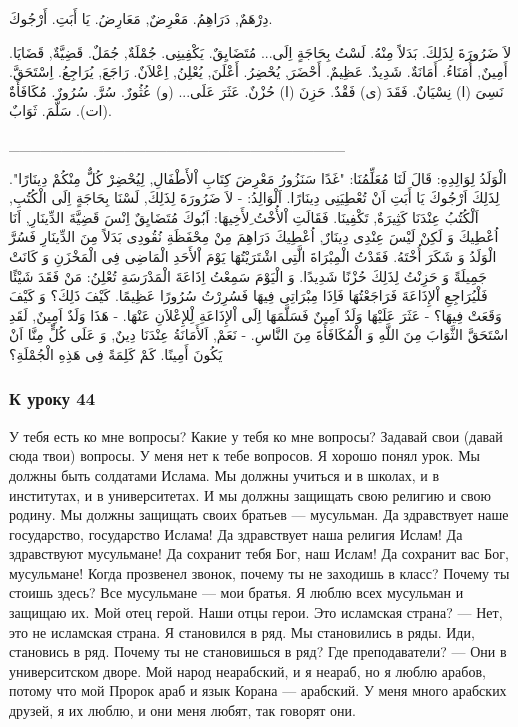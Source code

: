 \documentclass[a5paper]{article}
\begin{document}
دِرْهَمٌ, دَرَاهِمُ. مَعْرِضٌ, مَعَارِضُ. يَا أَبَتِ. أَرْجُوكَ. 

لاَ ضَرُورَةَ لِذَلِكَ. بَدَلاً مِنْهُ. لَسْتُ بِحَاجَةٍ اِلَى... مُتَضَايِقٌ. يَكْفِينِى. جُمْلَةٌ, جُمَلٌ. قَضِيَّةٌ, قَضَايَا. أَمِينٌ, أُمَنَاءُ. أَمَانَةٌ. شَدِيدٌ. عَظِيمٌ. أَحْضَرَ, يُحْضِرُ. أَعْلَنَ, يُعْلِنُ, اِعْلاَنٌ. رَاجَعَ, يُرَاجِعُ. اِسْتَحَقَّ. نَسِىَ (ا) نِسْيَانٌ. فَقَدَ (ى) فَقْدٌ. حَزِنَ (ا) حُزْنٌ. عَثَرَ عَلَى... (و) عُثُورٌ. سُرَّ. سُرُورٌ. مُكَافَأَةٌ (ات). سَلَّمَ. ثَوَابٌ.

\_\_\_\_\_\_\_\_\_\_\_\_\_\_\_\_\_\_\_\_\_\_\_\_\_\_\_\_\_\_\_\_

الْوَلَدُ لِوَالِدِهِ: قَالَ لَنَا مُعَلِّمُنَا: "غَدًا سَنَزُورُ مَعْرِضَ كِتَابِ اْلأَطْفَالِ, لِيُحْضِرْ كُلٌّ مِنْكُمْ دِينَارًا". لِذَلِكَ اَرْجُوكَ يَا أَبَتِ اَنْ تُعْطِيَنِى دِينَارًا. اَلْوَالِدُ: - لاَ ضَرُورَةَ لِذَلِكَ, لَسْنَا بِحَاجَةٍ اِلَى الْكُتُبِ, اَلْكُتُبُ عِنْدَنَا كَثِيرَةٌ, تَكْفِينَا. فَقَالَتِ اْلأُخْتُ ِلأَخِيهَا: اَبُوكَ مُتَضَايِقٌ اِنْسَ قَضِيَّةَ الدِّينَارِ, اَنَا اُعْطِيكَ وَ لَكِنْ لَيْسَ عِنْدِى دِينَارٌ, اُعْطِيكَ دَرَاهِمَ مِنْ مِحْفَظَةِ نُقُودِى بَدَلاً مِنَ الدِّينَارِ فَسُرَّ الْوَلَدُ وَ شَكَرَ أُخْتَهُ. فَقَدْتُ الْمِبْرَاةَ الَّتِى اشْتَرَيْتُهَا يَوْمَ اْلأَحَدِ الْمَاضِى فِى الْمَخْزَنِ وَ كَانَتْ جَمِيلَةً وَ حَزِنْتُ لِذَلِكَ حُزْنًا شَدِيدًا. وَ الْيَوْمَ سَمِعْتُ اِذَاعَةَ الْمَدْرَسَةِ تُعْلِنُ: مَنْ فَقَدَ شَيْئًا فَلْيُرَاجِعِ اْلإِذَاعَةَ فَرَاجَعْتُهَا فَاِذَا مِبْرَاتِى فِيهَا فَسُرِرْتُ سُرُورًا عَظِيمًا. كَيْفَ ذَلِكَ؟ وَ كَيْفَ وَقَعَتْ فِيهَا؟ - عَثَرَ عَلَيْهَا وَلَدٌ اَمِينٌ فَسَلَّمَهَا اِلَى اْلإِذَاعَةِ لِْلإِعْلاَنِ عَنْهَا. - هَذَا وَلَدٌ اَمِينٌ, لَقَدِ اسْتَحَقَّ الثَّوَابَ مِنَ اللَّهِ وَ الْمُكَافَأَةَ مِنَ النَّاسِ. - نَعَمْ, اَلأَمَانَةُ عِنْدَنَا دِينٌ, وَ عَلَى كُلٍّ مِنَّا اَنْ يَكُونَ أَمِينًا. كَمْ كَلِمَةً فِى هَذِهِ الْجُمْلَةِ؟

\subsubsection{К уроку 44}
У тебя есть ко мне вопросы? Какие у тебя ко мне вопросы? Задавай свои (давай сюда твои) вопросы. У меня нет к тебе вопросов. Я хорошо понял урок. Мы должны быть солдатами Ислама. Мы должны учиться и в школах, и в институтах, и в университетах. И мы должны защищать свою религию и свою родину. Мы должны защищать своих братьев — мусульман. Да здравствует наше государство, государство Ислама! Да здравствует наша религия Ислам! Да здравствуют мусульмане! Да сохранит тебя Бог, наш Ислам! Да сохранит вас Бог, мусульмане! Когда прозвенел звонок, почему ты не заходишь в класс? Почему ты стоишь здесь? Все мусульмане — мои братья. Я люблю всех мусульман и защищаю их. Мой отец герой. Наши отцы герои. Это исламская страна? — Нет, это не исламская страна. Я становился в ряд. Мы становились в ряды. Иди, становись в ряд. Почему ты не становишься в ряд? Где преподаватели? — Они в университском дворе. Мой народ неарабский, и я неараб, но я люблю арабов, потому что мой Пророк араб и язык Корана — арабский. У меня много арабских друзей, я их люблю, и они меня любят, так говорят они.
\end{document}
